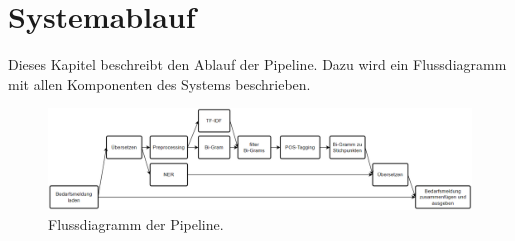 \section{Systemablauf}
Dieses Kapitel beschreibt den Ablauf der Pipeline. Dazu wird ein Flussdiagramm mit allen Komponenten des Systems beschrieben.
\begin{figure}[H]
	\centering  
	\includegraphics[width=\linewidth]{Abbildungen/flowchart.png}
	\caption{Flussdiagramm der Pipeline.}
	\label{fig:flowchart}
\end{figure}\mbox{} \\
